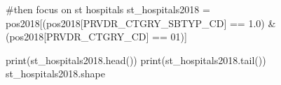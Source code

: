 \documentclass[
  letterpaper,
  DIV=11,
  numbers=noendperiod]{scrartcl}
\newenvironment{Shaded}{\begin{snugshade}}{\end{snugshade}}
\newcommand{\BuiltInTok}[1]{\textcolor[rgb]{0.00,0.23,0.31}{#1}}
\newcommand{\CommentTok}[1]{\textcolor[rgb]{0.37,0.37,0.37}{#1}}
\newcommand{\NormalTok}[1]{\textcolor[rgb]{0.00,0.23,0.31}{#1}}
\newcommand{\OperatorTok}[1]{\textcolor[rgb]{0.37,0.37,0.37}{#1}}
\newcommand{\StringTok}[1]{\textcolor[rgb]{0.13,0.47,0.30}{#1}}
\begin{document}
\begin{Shaded}
\begin{Highlighting}[]
\CommentTok{\#then focus on st hospitals }
\NormalTok{st\_hospitals2018 }\OperatorTok{=}\NormalTok{ pos2018[(pos2018[}\StringTok{\textquotesingle{}PRVDR\_CTGRY\_SBTYP\_CD\textquotesingle{}}\NormalTok{] }\OperatorTok{==} \StringTok{\textquotesingle{}1.0\textquotesingle{}}\NormalTok{) }\OperatorTok{\&}\NormalTok{ (pos2018[}\StringTok{\textquotesingle{}PRVDR\_CTGRY\_CD\textquotesingle{}}\NormalTok{] }\OperatorTok{==} \StringTok{\textquotesingle{}01\textquotesingle{}}\NormalTok{)]}

\BuiltInTok{print}\NormalTok{(st\_hospitals2018.head())}
\BuiltInTok{print}\NormalTok{(st\_hospitals2018.tail())}
\NormalTok{st\_hospitals2018.shape}
\end{Highlighting}
\end{Shaded}
\end{document}

